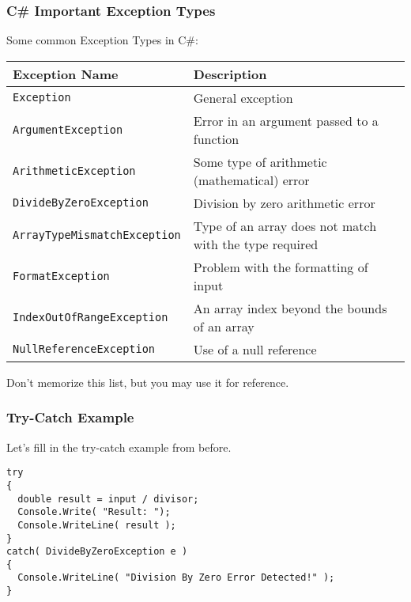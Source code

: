 \begin{frame}
\frametitle{C\# Important Exception Types}

Some common Exception Types in C\#:

{\scriptsize
\begin{center}
\begin{tabular}{l|l}
\textbf{Exception Name} & \textbf{Description} \\ \hline
\texttt{Exception} & General exception \\ \hline
\texttt{ArgumentException} & Error in an argument passed to a function \\ \hline
\texttt{ArithmeticException} & Some type of arithmetic (mathematical) error \\ \hline
\texttt{DivideByZeroException} & Division by zero arithmetic error \\ \hline
\texttt{ArrayTypeMismatchException} & Type of an array does not match with the type required \\ \hline
\texttt{FormatException} & Problem with the formatting of input \\ \hline
\texttt{IndexOutOfRangeException} & An array index beyond the bounds of an array \\ \hline
\texttt{NullReferenceException} & Use of a null reference \\
\end{tabular}
\end{center}
}

Don't memorize this list, but you may use it for reference.

\end{frame}


\begin{frame}[fragile]
\frametitle{Try-Catch Example}

Let's fill in the try-catch example from before.

\begin{verbatim}
try
{
  double result = input / divisor;
  Console.Write( "Result: ");
  Console.WriteLine( result );
}
catch( DivideByZeroException e )
{
  Console.WriteLine( "Division By Zero Error Detected!" );
}    
\end{verbatim}

\end{frame}

